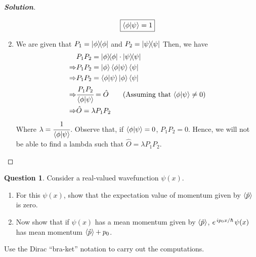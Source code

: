 \documentclass[10pt]{scrartcl}
\theoremstyle{definition}
\newtheorem{exercise}{Question}
\newenvironment{solution} {\begin{proof}[\normalfont \textbf{Solution}]} {\end{proof}}
\newcommand*{\OO}{\hat{O}}
\newcommand*{\Op}{\hat{p}}
\begin{document}
\begin{solution}
\begin{enumerate}[label={(\alph*)}]
            $$\boxed{\ip{\phi}{\psi} = 1}$$
        \item We are given that $P_1 = \op{\phi}$ and $P_2 = \op{\psi}{\psi}$ Then, we have
            \begin{align*}
                &P_1P_2 = \op{\phi}{\phi} \cdot \op{\psi}{\psi} \\
                \Rightarrow &P_1P_2 = \ket{\phi}\ip{\phi}{\psi}\bra{\psi} \\
                \Rightarrow &P_1P_2 = \ip{\phi}{\psi} \ket{\phi}\bra{\psi} \\
                \Rightarrow &\cfrac{P_1P_2}{\ip{\phi}{\psi}} = \OO \tag{Assuming that $\ip{\phi}{\psi} \neq 0$}\\
                \Rightarrow &\OO = \lambda P_1 P_2
            \end{align*}
            Where $\lambda = \cfrac{1}{\ip{\phi}{\psi}}$. Observe that, if $\ip{\phi}{\psi} = 0$, $P_1P_2 = 0$. Hence, we will not
            be able to find a lambda such that $\OO = \lambda P_1P_2$. 
    \end{enumerate}
\end{solution}
\begin{exercise}
    Consider a real-valued wavefunction $\psi(x)$.
    \begin{enumerate}[label=(\alph*)]
        \item For this $\psi(x)$, show that the expectation value of momentum given by $\expval{\Op}$ is zero.

        \item Now show that if $\psi(x)$ has a mean momentum given by $\expval{\Op}$, $e^{\flatfrac{i p_0 x}{\hbar}} \psi(x)$ has mean momentum $\expval{\Op} + p_0$.
    \end{enumerate}
    Use the Dirac “bra-ket” notation to carry out the computations.
\end{exercise}
\end{document}
